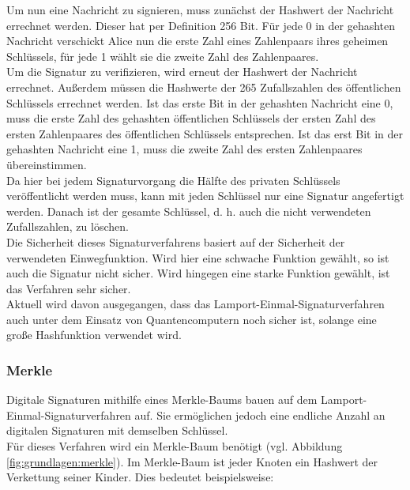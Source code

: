 			Um nun eine Nachricht zu signieren, muss zunächst der Hashwert der Nachricht errechnet werden. Dieser hat per Definition 256 Bit. Für jede 0 in der gehashten Nachricht verschickt Alice nun die erste Zahl eines Zahlenpaars ihres geheimen Schlüssels, für jede 1 wählt sie die zweite Zahl des Zahlenpaares.\\
			
			Um die Signatur zu verifizieren, wird erneut der Hashwert der Nachricht errechnet. Außerdem müssen die Hashwerte der 265 Zufallszahlen des öffentlichen Schlüssels errechnet werden. Ist das erste Bit in der gehashten Nachricht eine 0, muss die erste Zahl des gehashten öffentlichen Schlüssels der ersten Zahl des ersten Zahlenpaares des öffentlichen Schlüssels entsprechen. Ist das erst Bit in der gehashten Nachricht eine 1, muss die zweite Zahl des ersten Zahlenpaares übereinstimmen.\\
			
			Da hier bei jedem Signaturvorgang die Hälfte des privaten Schlüssels veröffentlicht werden muss, kann mit jeden Schlüssel nur eine Signatur angefertigt werden. Danach ist der gesamte Schlüssel, d. h. auch die nicht verwendeten Zufallszahlen, zu löschen.\\
			
			Die Sicherheit dieses Signaturverfahrens basiert auf der Sicherheit der verwendeten Einwegfunktion. Wird hier eine schwache Funktion gewählt, so ist auch die Signatur nicht sicher. Wird hingegen eine starke Funktion gewählt, ist das Verfahren sehr sicher.\\
			
			Aktuell wird davon ausgegangen, dass das Lamport-Einmal-Signaturverfahren auch unter dem Einsatz von Quantencomputern noch sicher ist, solange eine große Hashfunktion verwendet wird.
			
			\subsubsection{Merkle}
			\label{subsubsec:grundlagen:krypto:auth:merkle}
			
			Digitale Signaturen mithilfe eines Merkle-Baums bauen auf dem Lamport-Einmal-Signaturverfahren auf. Sie ermöglichen jedoch eine endliche Anzahl an digitalen Signaturen mit demselben Schlüssel.\\
			
			Für dieses Verfahren wird ein Merkle-Baum benötigt (vgl. Abbildung \ref{fig:grundlagen:merkle}). Im Merkle-Baum ist jeder Knoten ein Hashwert der Verkettung seiner Kinder. Dies bedeutet beispielsweise:
			
